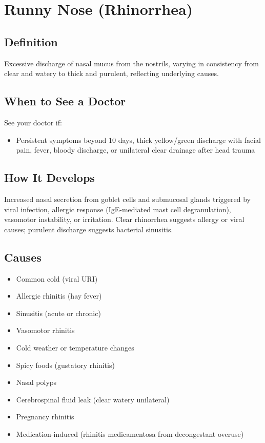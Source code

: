 \chapter{Runny Nose (Rhinorrhea)}

\section*{Definition}
Excessive discharge of nasal mucus from the nostrils, varying in consistency from clear and watery to thick and purulent, reflecting underlying causes.

\section*{When to See a Doctor}
See your doctor if:
\begin{itemize}
  \item Persistent symptoms beyond 10 days, thick yellow/green discharge with facial pain, fever, bloody discharge, or unilateral clear drainage after head trauma
\end{itemize}

\section*{How It Develops}
Increased nasal secretion from goblet cells and submucosal glands triggered by viral infection, allergic response (IgE-mediated mast cell degranulation), vasomotor instability, or irritation. Clear rhinorrhea suggests allergy or viral causes; purulent discharge suggests bacterial sinusitis.

\section*{Causes}
\begin{itemize}
  \item Common cold (viral URI)
  \item Allergic rhinitis (hay fever)
  \item Sinusitis (acute or chronic)
  \item Vasomotor rhinitis
  \item Cold weather or temperature changes
  \item Spicy foods (gustatory rhinitis)
  \item Nasal polyps
  \item Cerebrospinal fluid leak (clear watery unilateral)
  \item Pregnancy rhinitis
  \item Medication-induced (rhinitis medicamentosa from decongestant overuse)
\end{itemize}

